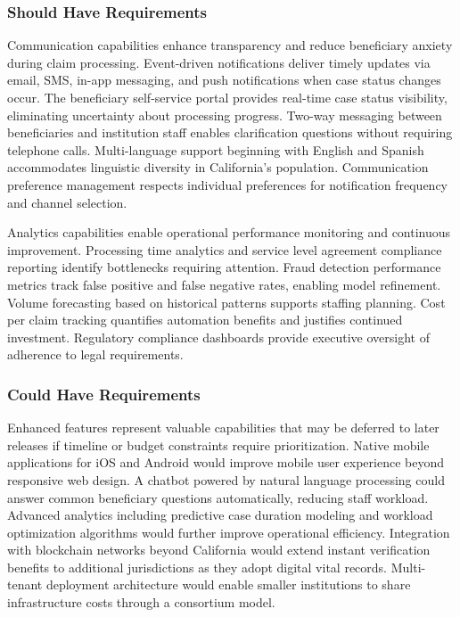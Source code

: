 \subsubsection{Should Have Requirements}

Communication capabilities enhance transparency and reduce beneficiary anxiety during claim processing. Event-driven notifications deliver timely updates via email, SMS, in-app messaging, and push notifications when case status changes occur. The beneficiary self-service portal provides real-time case status visibility, eliminating uncertainty about processing progress. Two-way messaging between beneficiaries and institution staff enables clarification questions without requiring telephone calls. Multi-language support beginning with English and Spanish accommodates linguistic diversity in California's population. Communication preference management respects individual preferences for notification frequency and channel selection.

Analytics capabilities enable operational performance monitoring and continuous improvement. Processing time analytics and service level agreement compliance reporting identify bottlenecks requiring attention. Fraud detection performance metrics track false positive and false negative rates, enabling model refinement. Volume forecasting based on historical patterns supports staffing planning. Cost per claim tracking quantifies automation benefits and justifies continued investment. Regulatory compliance dashboards provide executive oversight of adherence to legal requirements.

\subsubsection{Could Have Requirements}

Enhanced features represent valuable capabilities that may be deferred to later releases if timeline or budget constraints require prioritization. Native mobile applications for iOS and Android would improve mobile user experience beyond responsive web design. A chatbot powered by natural language processing could answer common beneficiary questions automatically, reducing staff workload. Advanced analytics including predictive case duration modeling and workload optimization algorithms would further improve operational efficiency. Integration with blockchain networks beyond California would extend instant verification benefits to additional jurisdictions as they adopt digital vital records. Multi-tenant deployment architecture would enable smaller institutions to share infrastructure costs through a consortium model.

